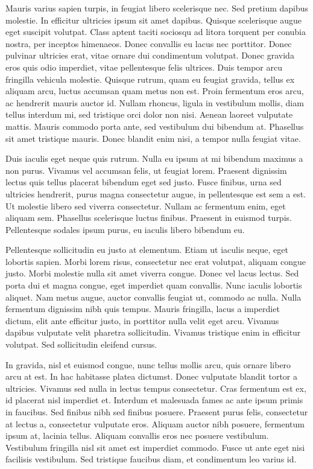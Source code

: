 \documentclass[12pt]{article}
\begin{document}


Mauris varius sapien turpis, in feugiat libero scelerisque nec. Sed pretium dapibus molestie. In efficitur ultricies ipsum sit amet dapibus. Quisque scelerisque augue eget suscipit volutpat. Class aptent taciti sociosqu ad litora torquent per conubia nostra, per inceptos himenaeos. Donec convallis eu lacus nec porttitor. Donec pulvinar ultricies erat, vitae ornare dui condimentum volutpat. Donec gravida eros quis odio imperdiet, vitae pellentesque felis ultrices. Duis tempor arcu fringilla vehicula molestie. Quisque rutrum, quam eu feugiat gravida, tellus ex aliquam arcu, luctus accumsan quam metus non est. Proin fermentum eros arcu, ac hendrerit mauris auctor id. Nullam rhoncus, ligula in vestibulum mollis, diam tellus interdum mi, sed tristique orci dolor non nisi. Aenean laoreet vulputate mattis. Mauris commodo porta ante, sed vestibulum dui bibendum at. Phasellus sit amet tristique mauris. Donec blandit enim nisi, a tempor nulla feugiat vitae.

Duis iaculis eget neque quis rutrum. Nulla eu ipsum at mi bibendum maximus a non purus. Vivamus vel accumsan felis, ut feugiat lorem. Praesent dignissim lectus quis tellus placerat bibendum eget sed justo. Fusce finibus, urna sed ultricies hendrerit, purus magna consectetur augue, in pellentesque est sem a est. Ut molestie libero sed viverra consectetur. Nullam ac fermentum enim, eget aliquam sem. Phasellus scelerisque luctus finibus. Praesent in euismod turpis. Pellentesque sodales ipsum purus, eu iaculis libero bibendum eu.

Pellentesque sollicitudin eu justo at elementum. Etiam ut iaculis neque, eget lobortis sapien. Morbi lorem risus, consectetur nec erat volutpat, aliquam congue justo. Morbi molestie nulla sit amet viverra congue. Donec vel lacus lectus. Sed porta dui et magna congue, eget imperdiet quam convallis. Nunc iaculis lobortis aliquet. Nam metus augue, auctor convallis feugiat ut, commodo ac nulla. Nulla fermentum dignissim nibh quis tempus. Mauris fringilla, lacus a imperdiet dictum, elit ante efficitur justo, in porttitor nulla velit eget arcu. Vivamus dapibus vulputate velit pharetra sollicitudin. Vivamus tristique enim in efficitur volutpat. Sed sollicitudin eleifend cursus.

In gravida, nisl et euismod congue, nunc tellus mollis arcu, quis ornare libero arcu at est. In hac habitasse platea dictumst. Donec vulputate blandit tortor a ultricies. Vivamus sed nulla in lectus tempus consectetur. Cras fermentum est ex, id placerat nisl imperdiet et. Interdum et malesuada fames ac ante ipsum primis in faucibus. Sed finibus nibh sed finibus posuere. Praesent purus felis, consectetur at lectus a, consectetur vulputate eros. Aliquam auctor nibh posuere, fermentum ipsum at, lacinia tellus. Aliquam convallis eros nec posuere vestibulum. Vestibulum fringilla nisl sit amet est imperdiet commodo. Fusce ut ante eget nisi facilisis vestibulum. Sed tristique faucibus diam, et condimentum leo varius id.
\end{document}

